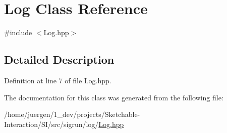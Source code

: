 \hypertarget{class_log}{}\section{Log Class Reference}
\label{class_log}


{\ttfamily \#include $<$Log.\+hpp$>$}



\subsection{Detailed Description}


Definition at line 7 of file Log.\+hpp.



The documentation for this class was generated from the following file\+:\begin{DoxyCompactItemize}
\item 
/home/juergen/1\+\_\+dev/projects/\+Sketchable-\/\+Interaction/\+S\+I/src/sigrun/log/\mbox{\hyperlink{_log_8hpp}{Log.\+hpp}}\end{DoxyCompactItemize}
